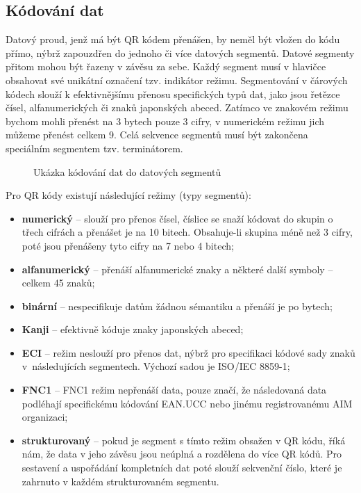 \subsection{Kódování dat}
\label{kodovaniDat}

Datový proud, jenž má být QR kódem přenášen, by neměl být vložen do kódu přímo,
nýbrž zapouzdřen do jednoho či více datových segmentů. Datové segmenty přitom 
mohou být řazeny v závěsu za sebe. Každý segment musí v hlavičce obsahovat své
unikátní označení tzv. indikátor režimu. Segmentování v čárových kódech slouží
k efektivnějšímu přenosu specifických typů dat, jako jsou řetězce čísel,
alfanumerických či znaků japonských abeced. Zatímco ve znakovém režimu bychom
mohli přenést na 3 bytech pouze 3 cifry, v numerickém režimu jich můžeme přenést
celkem 9.  Celá sekvence segmentů musí být zakončena speciálním segmentem tzv.
terminátorem.

\begin{figure}[H]
  \begin{center}
    \caption{Ukázka kódování dat do datových segmentů}
    \label{QRCodeDataSegments}
  \end{center}
\end{figure}

\bigskip \noindent Pro QR kódy existují následující režimy (typy segmentů): 
\begin{itemize}
  \item \textbf{numerický} -- slouží pro přenos čísel, číslice se snaží kódovat
 do skupin o třech cifrách a přenášet je na 10 bitech. Obsahuje-li skupina méně 
 než 3 cifry, poté jsou přenášeny tyto cifry na 7 nebo 4 bitech;
  \item \textbf{alfanumerický} -- přenáší alfanumerické znaky a některé další 
  symboly -- celkem 45 znaků;
  \item \textbf{binární} -- nespecifikuje datům žádnou sémantiku a přenáší je po
  bytech;
  \item \textbf{Kanji} -- efektivně kóduje znaky japonských abeced;
  \item \textbf{ECI} -- režim neslouží pro přenos dat, nýbrž pro specifikaci
  kódové sady znaků v~následujících segmentech. Výchozí sadou je ISO/IEC 8859-1;
  \item \textbf{FNC1} -- FNC1 režim nepřenáší data, pouze značí, že následovaná
  data podléhají specifickému kódování EAN.UCC nebo jinému registrovanému AIM organizaci;
  \item \textbf{strukturovaný} -- pokud je segment s tímto režim obsažen v QR 
  kódu, říká nám, že data v jeho závěsu jsou neúplná a rozdělena do více QR 
  kódů. Pro sestavení a uspořádání kompletních dat poté slouží sekvenční 
  číslo, které je zahrnuto v každém strukturovaném segmentu.
\end{itemize}

